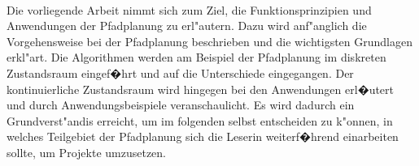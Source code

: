 \kurzfassung

\paragraph*{}

Die vorliegende Arbeit nimmt sich zum Ziel, die Funktionsprinzipien und Anwendungen der Pfadplanung zu erl"autern. Dazu wird anf"anglich die Vorgehensweise bei der Pfadplanung beschrieben und die wichtigsten Grundlagen erkl"art. Die Algorithmen werden am Beispiel der Pfadplanung im diskreten Zustandsraum eingef�hrt und auf die Unterschiede eingegangen. Der kontinuierliche Zustandsraum wird hingegen bei den Anwendungen erl�utert und durch Anwendungsbeispiele veranschaulicht.
Es wird dadurch ein Grundverst"andis erreicht, um im folgenden selbst entscheiden zu k"onnen, in welches Teilgebiet der Pfadplanung sich die Leserin weiterf�hrend einarbeiten sollte, um Projekte umzusetzen.

